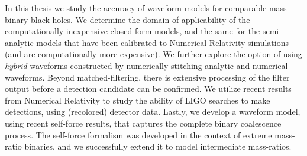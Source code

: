 
In this thesis we study the accuracy of waveform models for comparable mass
binary black holes.
We determine the domain of applicability of the computationally inexpensive closed 
form models, and the same for the semi-analytic models that have been calibrated
to Numerical Relativity simulations (and are computationally more expensive).
We further explore the option of 
using {\it hybrid} waveforms constructed by numerically stitching 
analytic and numerical waveforms. Beyond matched-filtering, there 
is extensive processing of the filter output before a detection candidate can
be confirmed. We utilize recent results from Numerical Relativity to study
the ability of LIGO searches to make detections, using (recolored) detector data.
Lastly, we develop a waveform model, using recent self-force results, that 
captures the complete binary coalescence process. The self-force formalism was
developed in the context of extreme mass-ratio binaries, and we successfully
extend it to model intermediate mass-ratios.
